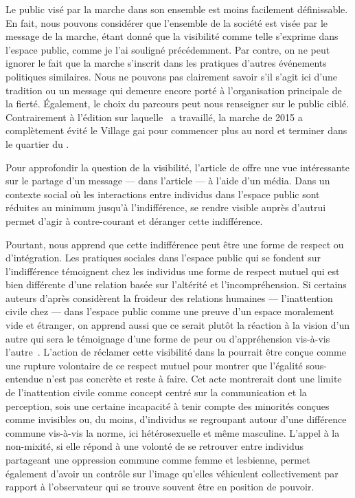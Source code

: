 Le public visé par la marche dans son ensemble est moins facilement définissable. 
En fait, nous pouvons considérer que l'ensemble de la société est visée par le message de la marche, étant donné que la visibilité comme telle s'exprime dans l'espace public, comme je l'ai souligné précédemment. 
Par contre, on ne peut ignorer le fait que la marche s'inscrit dans les pratiques d'autres événements politiques similaires. 
Nous ne pouvons pas clairement savoir s'il s'agit ici d'une tradition ou un message qui demeure encore porté à l'organisation principale de la fierté. 
Également, le choix du parcours peut nous renseigner sur le public ciblé. 
Contrairement à l'édition sur laquelle~\citet{Podmore2015a} a travaillé, la marche de 2015 a complètement évité le Village gai pour commencer plus au nord et terminer dans le quartier du .

Pour approfondir la question de la visibilité, l'article de \citet{Frosh2006}  offre une vue intéressante sur le partage d'un message ---  dans l'article --- à l'aide d'un média. 
Dans un contexte social où les interactions entre individus dans l'espace public sont réduites au minimum jusqu'à l'indifférence, se rendre visible auprès d'autrui permet d'agir à contre-courant et déranger cette indifférence. 

Pourtant, \citeauthor{Frosh2006} nous apprend que cette indifférence peut être une forme de respect ou d'intégration. 
Les pratiques sociales dans l'espace public qui se fondent sur l'indifférence témoignent chez les individus une forme de respect mutuel qui est bien différente d'une relation basée sur l'altérité et l'incompréhension. 
Si certains auteurs d'après \citeauthor{Frosh2006} considèrent la froideur des relations humaines --- l'inattention civile chez \citeauthor{Goffman1956} --- dans l'espace public comme une preuve d'un espace moralement vide et étranger, on apprend aussi que ce serait plutôt la réaction à la vision d'un autre qui sera le témoignage d'une forme de peur ou d'appréhension vis-à-vis l'autre~\citep[279--280]{Frosh2006}. 
L'action de réclamer cette visibilité dans la \dm{} pourrait être conçue comme une rupture volontaire de ce respect mutuel pour montrer que l'égalité sous-entendue n'est pas concrète et reste à faire. 
Cet acte montrerait dont une limite de l'inattention civile comme concept centré sur la communication et la perception, sois une certaine incapacité à tenir compte des minorités conçues comme invisibles ou, du moins, d'individus se regroupant autour d'une différence commune vis-à-vis la norme, ici hétérosexuelle et même masculine. 
L'appel à la non-mixité, si elle répond à une volonté de se retrouver entre individus partageant une oppression commune comme femme et lesbienne, permet également d'avoir un contrôle sur l'image qu'elles véhiculent collectivement par rapport à l'observateur qui se trouve souvent être en position de pouvoir.

